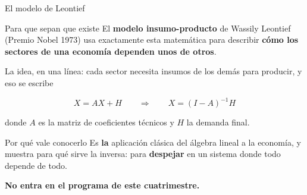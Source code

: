 \documentclass[aspectratio=169,10pt]{beamer}
\begin{document}
\begin{frame}{El modelo de Leontief}

\begin{block}{Para que sepan que existe}
El \textbf{modelo insumo-producto} de Wassily Leontief (Premio Nobel 1973) usa exactamente esta
matemática para describir \textbf{cómo los sectores de una economía dependen unos de otros}.
\end{block}

\vspace{0.3cm}
La idea, en una línea: cada sector necesita insumos de los demás para producir, y eso se escribe

$$X = AX + H \qquad \Longrightarrow \qquad X = (I - A)^{-1} H$$

donde $A$ es la matriz de coeficientes técnicos y $H$ la demanda final.

\vspace{0.3cm}
\begin{alertblock}{Por qué vale conocerlo}
Es \textbf{la} aplicación clásica del álgebra lineal a la economía, y muestra para qué sirve la
inversa: para \textbf{despejar} en un sistema donde todo depende de todo.

\textbf{No entra en el programa de este cuatrimestre.}
\end{alertblock}
\end{frame}
\end{document}
